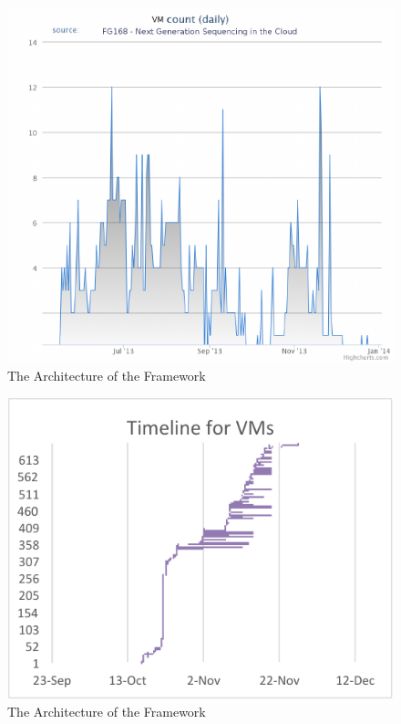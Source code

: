 \documentclass{sig-alternate}
\begin{document}
\begin{figure}[htb] 
  \centering 
    \includegraphics[width=1.0\columnwidth]{images/fig2.pdf} 
  \caption{The Architecture of the Framework}\label{F:fig2} 
\end{figure} 

\begin{figure}[htb] 
  \centering 
    \includegraphics[width=1.0\columnwidth]{images/fig3.pdf} 
  \caption{The Architecture of the Framework}\label{F:fig3} 
\end{figure} 
\end{document}
